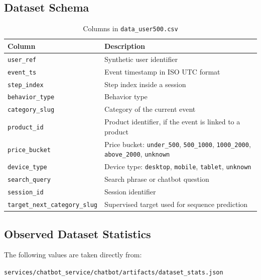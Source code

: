 \documentclass[12pt,a4paper]{article}
\begin{document}
\subsection{Dataset Schema}
\begin{table}[H]
\centering
\caption{Columns in \texttt{data\_user500.csv}}
\begin{tabularx}{\linewidth}{>{\raggedright\arraybackslash}p{3.2cm} >{\raggedright\arraybackslash}X}
\toprule
Column & Description \\
\midrule
\texttt{user\_ref} & Synthetic user identifier \\
\texttt{event\_ts} & Event timestamp in ISO UTC format \\
\texttt{step\_index} & Step index inside a session \\
\texttt{behavior\_type} & Behavior type \\
\texttt{category\_slug} & Category of the current event \\
\texttt{product\_id} & Product identifier, if the event is linked to a product \\
\texttt{price\_bucket} & Price bucket: \texttt{under\_500}, \texttt{500\_1000}, \texttt{1000\_2000}, \texttt{above\_2000}, \texttt{unknown} \\
\texttt{device\_type} & Device type: \texttt{desktop}, \texttt{mobile}, \texttt{tablet}, \texttt{unknown} \\
\texttt{search\_query} & Search phrase or chatbot question \\
\texttt{session\_id} & Session identifier \\
\texttt{target\_next\_category\_slug} & Supervised target used for sequence prediction \\
\bottomrule
\end{tabularx}
\end{table}

\subsection{Observed Dataset Statistics}
The following values are taken directly from:
\begin{center}
\texttt{services/chatbot\_service/chatbot/artifacts/dataset\_stats.json}
\end{center}
\end{document}
